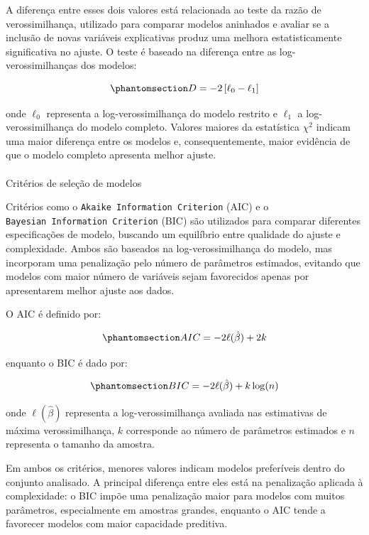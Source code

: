 \documentclass[
  brazilian,
  12pt,
  letterpaper,
  DIV=11,
  numbers=noendperiod]{scrartcl}
\makeatletter
\let\oldparagraph\paragraph
\renewcommand{\paragraph}{
    \@ifstar
      \xxxParagraphStar
      \xxxParagraphNoStar
  }
\newcommand{\xxxParagraphStar}[1]{\oldparagraph*{#1}\mbox{}}
\newcommand{\xxxParagraphNoStar}[1]{\oldparagraph{#1}\mbox{}}
\makeatother
\begin{document}
A diferença entre esses dois valores está relacionada ao teste da razão
de verossimilhança, utilizado para comparar modelos aninhados e avaliar
se a inclusão de novas variáveis explicativas produz uma melhora
estatisticamente significativa no ajuste. O teste é baseado na diferença
entre as log-verossimilhanças dos modelos:

\begin{equation}\protect\phantomsection\label{eq-lrt}{
D=
-2
\left[
\ell_0-\ell_1
\right]
}\end{equation}

onde \(\ell_0\) representa a log-verossimilhança do modelo restrito e
\(\ell_1\) a log-verossimilhança do modelo completo. Valores maiores da
estatística \(\chi^2\) indicam uma maior diferença entre os modelos e,
consequentemente, maior evidência de que o modelo completo apresenta
melhor ajuste.

\paragraph{Critérios de seleção de
modelos}\label{crituxe9rios-de-seleuxe7uxe3o-de-modelos}

Critérios como o \texttt{Akaike\ Information\ Criterion} (AIC) e o
\texttt{Bayesian\ Information\ Criterion} (BIC) são utilizados para
comparar diferentes especificações de modelo, buscando um equilíbrio
entre qualidade do ajuste e complexidade. Ambos são baseados na
log-verossimilhança do modelo, mas incorporam uma penalização pelo
número de parâmetros estimados, evitando que modelos com maior número de
variáveis sejam favorecidos apenas por apresentarem melhor ajuste aos
dados.

O AIC é definido por:

\begin{equation}\protect\phantomsection\label{eq-aic}{
AIC=
-2\ell(\hat{\beta})+2k
}\end{equation}

enquanto o BIC é dado por:

\begin{equation}\protect\phantomsection\label{eq-bic}{
BIC=
-2\ell(\hat{\beta})+k\log(n)
}\end{equation}

onde \(\ell(\hat{\beta})\) representa a log-verossimilhança avaliada nas
estimativas de máxima verossimilhança, \(k\) corresponde ao número de
parâmetros estimados e \(n\) representa o tamanho da amostra.

Em ambos os critérios, menores valores indicam modelos preferíveis
dentro do conjunto analisado. A principal diferença entre eles está na
penalização aplicada à complexidade: o BIC impõe uma penalização maior
para modelos com muitos parâmetros, especialmente em amostras grandes,
enquanto o AIC tende a favorecer modelos com maior capacidade preditiva.
\end{document}
